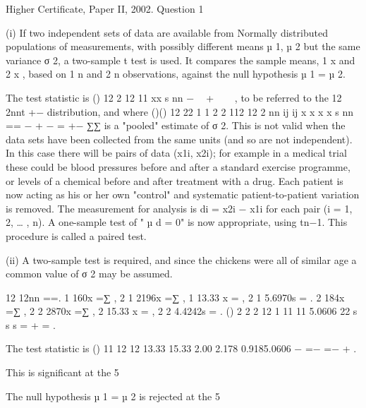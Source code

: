 \documentclass[a4paper,12pt]{article}
\begin{document}
Higher Certificate, Paper II, 2002.  Question 1 
 
 
(i) If two independent sets of data are available from Normally distributed populations of measurements, with possibly different means µ 1, µ 2 but the same variance σ
 2, a two-sample t test is used.  It compares the sample means, 1 x and 2 x , based on 1 n and 2 n observations, against the null hypothesis µ 1 = µ 2. 
 
The test statistic is 
 () 12
2
12 11 xx
s
nn
−  +   ,  to be referred to the 12 2nnt +− distribution, and where 
 ()() 12 22 1 1 2 2 112
12 2
nn
ij ij x x x x
s
nn == − + −
=
+− ∑∑  is a "pooled" estimate of σ
 2. 
 This is not valid when the data sets have been collected from the same units (and so are not independent).  In this case there will be pairs of data (x1i, x2i);  for example in a medical trial these could be blood pressures before and after a standard exercise programme, or levels of a chemical before and after treatment with a drug.  Each patient is now acting as his or her own "control" and systematic patient-to-patient variation is removed.  The measurement for analysis is di = x2i − x1i for each pair (i = 1, 2, … , n).  A one-sample test of " µ d = 0" is now appropriate, using tn−1.  This procedure is called a paired test. 
 
 
(ii) A two-sample test is required, and since the chickens were all of similar age a common value of σ 2 may be assumed. 
 
12 12nn ==. 
 1 160x =∑ ,   2 1 2196x =∑ ,   1 13.33 x = ,   2 1 5.6970s = . 
 2 184x =∑ ,   2 2 2870x =∑ ,   2 15.33 x = ,   2 2 4.4242s = . 
 () 2 2 2 12 1 11 11 5.0606 22 s s s = + = . 
 
The test statistic is 
() 11 12 12 13.33 15.33 2.00 2.178 0.9185.0606 − =− =− +
. 
 
This is significant at the 5%
 
The null hypothesis µ 1 = µ 2 is rejected at the 5%
\end{document}
